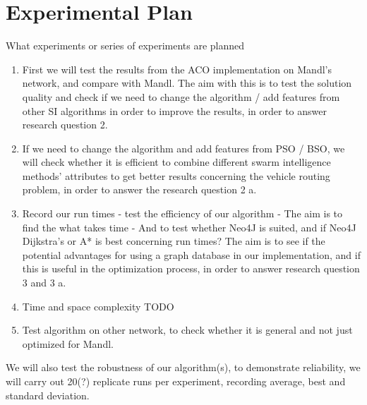 \section{Experimental Plan}



What experiments or series of experiments are planned

\begin{enumerate}
\item First we will test the results from the ACO implementation on Mandl's network, and compare with Mandl. 
The aim with this is to test the solution quality and check if we need to change the algorithm / add features from other SI algorithms in order to improve the results, in order to answer research question 2.

\item If we need to change the algorithm and add features from PSO / BSO, we will check whether it is efficient to combine different swarm intelligence methods' attributes to get better results concerning the vehicle routing problem, in order to answer the research question 2 a.

\item Record our run times - test the efficiency of our algorithm - The aim is to find the what takes time - And to test whether Neo4J is suited, and if Neo4J Dijkstra's or A* is best concerning run times? The aim is to see if the potential advantages for using a graph database in our implementation, and if this is useful in the optimization process, in order to answer research question 3 and 3 a.

\item Time and space complexity TODO

\item Test algorithm on other network, to check whether it is general and not just optimized for Mandl.

\end{enumerate}

We will also test the robustness of our algorithm(s), to demonstrate reliability, we will carry out 20(?) replicate runs per experiment, recording average, best and standard deviation. 


